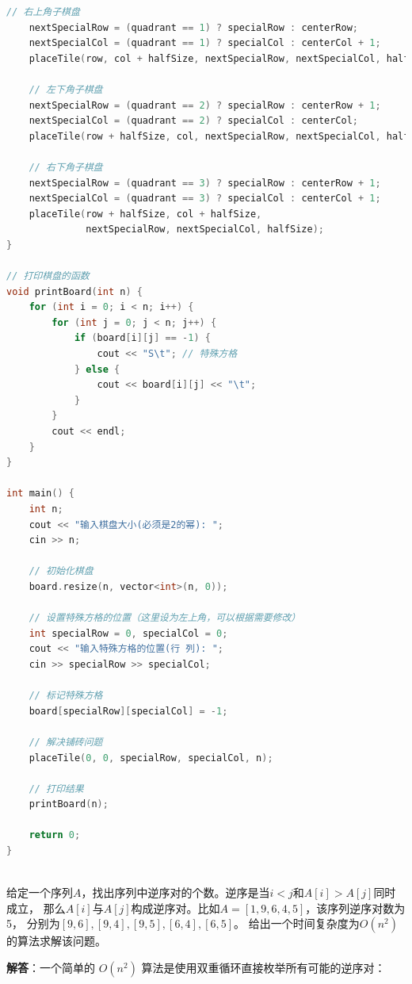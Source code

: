 \documentclass[12pt,twoside]{article}
\begin{document}
\begin{problems}
\begin{lstlisting}[language=C++]
    // 右上角子棋盘
    nextSpecialRow = (quadrant == 1) ? specialRow : centerRow;
    nextSpecialCol = (quadrant == 1) ? specialCol : centerCol + 1;
    placeTile(row, col + halfSize, nextSpecialRow, nextSpecialCol, halfSize);
    
    // 左下角子棋盘
    nextSpecialRow = (quadrant == 2) ? specialRow : centerRow + 1;
    nextSpecialCol = (quadrant == 2) ? specialCol : centerCol;
    placeTile(row + halfSize, col, nextSpecialRow, nextSpecialCol, halfSize);
    
    // 右下角子棋盘
    nextSpecialRow = (quadrant == 3) ? specialRow : centerRow + 1;
    nextSpecialCol = (quadrant == 3) ? specialCol : centerCol + 1;
    placeTile(row + halfSize, col + halfSize, 
              nextSpecialRow, nextSpecialCol, halfSize);
}

// 打印棋盘的函数
void printBoard(int n) {
    for (int i = 0; i < n; i++) {
        for (int j = 0; j < n; j++) {
            if (board[i][j] == -1) {
                cout << "S\t"; // 特殊方格
            } else {
                cout << board[i][j] << "\t";
            }
        }
        cout << endl;
    }
}

int main() {
    int n;
    cout << "输入棋盘大小(必须是2的幂): ";
    cin >> n;
    
    // 初始化棋盘
    board.resize(n, vector<int>(n, 0));
    
    // 设置特殊方格的位置（这里设为左上角，可以根据需要修改）
    int specialRow = 0, specialCol = 0;
    cout << "输入特殊方格的位置(行 列): ";
    cin >> specialRow >> specialCol;
    
    // 标记特殊方格
    board[specialRow][specialCol] = -1;
    
    // 解决铺砖问题
    placeTile(0, 0, specialRow, specialCol, n);
    
    // 打印结果
    printBoard(n);
    
    return 0;
}
\end{lstlisting}

\newpage
{} \\
给定一个序列$A$，找出序列中逆序对的个数。逆序是当$i<j$和$A[i]>A[j]$同时成立，
那么$A[i]$与$A[j]$构成逆序对。比如$A=[1, 9, 6, 4, 5]$，该序列逆序对数为5，
分别为$[9, 6], [9, 4], [9, 5], [6, 4], [6, 5]$。
\bparts
\ppart 给出一个时间复杂度为$O(n^2)$的算法求解该问题。

\textbf{解答}：一个简单的 $O(n^2)$ 算法是使用双重循环直接枚举所有可能的逆序对：


\end{problems}
\end{document}
